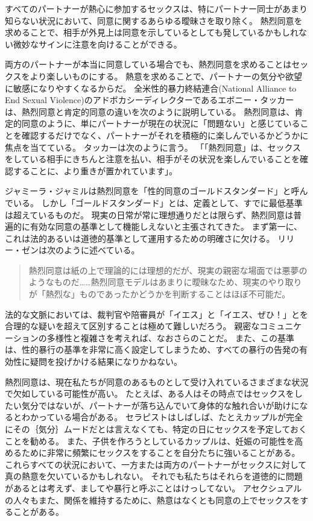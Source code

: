 \documentclass[paper=a4,book,openany]{jlreq}
\newcommand{\ig}[1]{}           %
\begin{document}
すべてのパートナーが熱心に参加するセックスは、特にパートナー同士があまり知らない状況において、同意に関するあらゆる曖昧さを取り除く。
熱烈同意を求めることで、相手が外見上は同意を示しているとしても発しているかもしれない微妙なサインに注意を向けることができる。

両方のパートナーが本当に同意している場合でも、熱烈同意を求めることはセックスをより楽しいものにする。
熱意を求めることで、パートナーの気分や欲望に敏感になりやすくなるからだ。
全米性的暴力終結連合(National Alliance to End Sexual Violence)のアドボカシーディレクターであるエボニー・タッカー\ig{Ebony Tucker}は、熱烈同意と肯定的同意の違いを次のように説明している。
熱烈同意は、肯定的同意のように、単にパートナーが現在の状況に「問題ない」と感じていることを確認するだけでなく、パートナーがそれを積極的に楽しんでいるかどうかに焦点を当てている。
タッカーは次のように言う。
「「熱烈同意」は、セックスをしている相手にきちんと注意を払い、相手がその状況を楽しんでいることを確認することに、より重きが置かれています」\citep{cooney18:_aziz_ansar_alleg_has_peopl}。

ジャミーラ・ジャミル\ig{Jameela Jamil}は熱烈同意を「性的同意のゴールドスタンダード」と呼んでいる\citep{jamil18:_what_we_need_learn_aziz_ansar_clust}。
しかし「ゴールドスタンダード」とは、定義として、すでに最低基準は超えているものだ。
現実の日常が常に理想通りだとは限らず、熱烈同意は普遍的に有効な同意の基準として機能しえないと主張されてきた。
まず第一に、これは法的あるいは道徳的基準として運用するための明確さに欠ける。
リリー・ゼン\ig{Lily Zheng}は次のように述べている。

\begin{quote}
熱烈同意は紙の上で理論的には理想的だが、現実の親密な場面では悪夢のようなものだ……熱烈同意モデルはあまりに曖昧なため、現実のやり取りが「熱烈な」ものであったかどうかを判断することはほぼ不可能だ。
\citep{zheng14:_how_ace_sex}

\end{quote}

法的な文脈においては、裁判官や陪審員が「イエス」と「イエス、ぜひ！」とを合理的な疑いを超えて区別することは極めて難しいだろう。
親密なコミュニケーションの多様性と複雑さを考えれば、なおさらのことだ。
また、この基準は、性的暴行の基準を非常に高く設定してしまうため、すべての暴行の告発の有効性に疑問を投げかける結果になりかねない。

熱烈同意は、現在私たちが同意のあるものとして受け入れているさまざまな状況で欠如している可能性が高い。
たとえば、ある人はその時点ではセックスをしたい気分ではないが、パートナーが落ち込んでいて身体的な触れ合いが助けになるとわかっている場合がある。
セラピストはしばしば、たとえカップルが完全にその｛気分｝{ムード}だとは言えなくても、特定の日にセックスを予定しておくことを勧める。
また、子供を作ろうとしているカップルは、妊娠の可能性を高めるために非常に頻繁にセックスをすることを自分たちに強いることがある。
これらすべての状況において、一方または両方のパートナーがセックスに対して真の熱意を欠いているかもしれない。
それでも私たちはそれらを道徳的に問題があるとは考えず、ましてや暴行と呼ぶことはけっしてない。
アセクシュアルの人々もまた、関係を維持するために、熱意はなくとも同意の上でセックスをすることがある。
\end{document}

